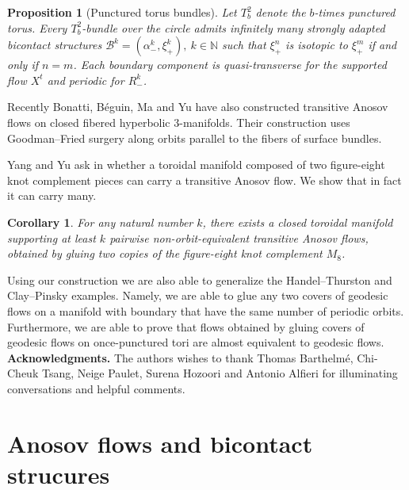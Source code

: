 \documentclass{amsart}
\newtheorem{corollary}[theorem]{Corollary}
\newtheorem{proposition}[theorem]{Proposition}
\theoremstyle{definition}
\theoremstyle{remark}
\begin{document}
\begin{proposition}
[Punctured torus bundles]
\label{pro:torus}
Let  $T^2_b$ denote the $b$-times punctured torus. Every $T^2_b$-bundle over the circle admits infinitely many  strongly adapted bicontact structures $\mathcal{B}^k = (\alpha_-^k, \xi_+^k),\ k\in\mathbb{N}$ such that $\xi_+^n$ is isotopic to $\xi_+^m$ if and only if $n = m$. Each boundary component is quasi-transverse for the supported flow $X^t$ and periodic for $R_-^k$.
\end{proposition}

Recently Bonatti, Béguin, Ma and Yu \cite{BBMY}  have also constructed transitive Anosov flows on closed fibered hyperbolic $3$-manifolds. Their construction uses Goodman--Fried surgery along orbits parallel to the fibers of surface bundles. 

Yang and Yu ask in \cite{YangYu2022Classifying} whether a toroidal manifold composed of two figure-eight knot complement pieces can carry a transitive Anosov flow. We show that in fact it can carry many.

\begin{corollary}
\label{cor:figure8}
For any natural number $k$, there exists a closed toroidal manifold supporting at least $k$ pairwise non-orbit-equivalent transitive Anosov flows, obtained by gluing two copies of the figure-eight knot complement $M_8$.
\end{corollary}


Using our construction we are also able to generalize the Handel--Thurston  and Clay--Pinsky \cite{ClayPinsky2025Graph} examples. Namely, we are able to glue any two covers of geodesic flows on a manifold with boundary that have the same number of periodic orbits. Furthermore, we are able to prove that flows obtained by gluing covers of geodesic flows on once-punctured tori are almost equivalent to geodesic flows.\\
 
\textbf{Acknowledgments.} The authors wishes to thank Thomas Barthelmé, Chi-Cheuk Tsang, Neige Paulet, Surena Hozoori and Antonio Alfieri for illuminating conversations and helpful comments.



   
\section{Anosov flows and bicontact strucures}
\end{document}
